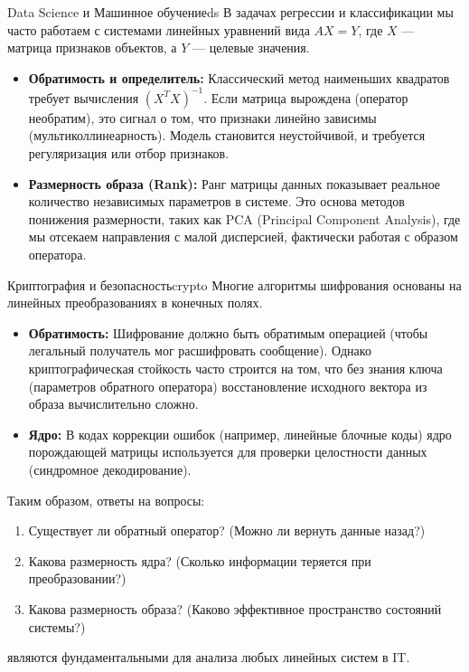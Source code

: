\documentclass[12pt,a4paper]{article}
\begin{document}
\begin{remarkIT}{Data Science и Машинное обучение}{ds}
  В задачах регрессии и классификации мы часто работаем с системами
  линейных уравнений вида $AX = Y$, где $X$ — матрица признаков
  объектов, а $Y$ — целевые значения.
  \begin{itemize}
    \item \textbf{Обратимость и определитель:} Классический метод
      наименьших квадратов требует вычисления $(X^T X)^{-1}$. Если
      матрица вырождена (оператор необратим), это сигнал о том, что
      признаки линейно зависимы (мультиколлинеарность). Модель
      становится неустойчивой, и требуется регуляризация или отбор признаков.
    \item \textbf{Размерность образа (Rank):} Ранг матрицы данных
      показывает реальное количество независимых параметров в
      системе. Это основа методов понижения размерности, таких как
      PCA (Principal Component Analysis), где мы отсекаем направления
      с малой дисперсией, фактически работая с образом оператора.
  \end{itemize}
\end{remarkIT}

\begin{remarkIT}{Криптография и безопасность}{crypto}
  Многие алгоритмы шифрования основаны на линейных преобразованиях в
  конечных полях.
  \begin{itemize}
    \item \textbf{Обратимость:} Шифрование должно быть обратимым
      операцией (чтобы легальный получатель мог расшифровать
      сообщение). Однако криптографическая стойкость часто строится
      на том, что без знания ключа (параметров обратного оператора)
      восстановление исходного вектора из образа вычислительно сложно.
    \item \textbf{Ядро:} В кодах коррекции ошибок (например, линейные
      блочные коды) ядро порождающей матрицы используется для
      проверки целостности данных (синдромное декодирование).
  \end{itemize}
\end{remarkIT}

Таким образом, ответы на вопросы:
\begin{enumerate}
  \item Существует ли обратный оператор? (Можно ли вернуть данные назад?)
  \item Какова размерность ядра? (Сколько информации теряется при
    преобразовании?)
  \item Какова размерность образа? (Каково эффективное пространство
    состояний системы?)
\end{enumerate}
являются фундаментальными для анализа любых линейных систем в IT.
\end{document}
